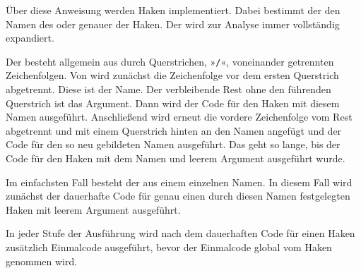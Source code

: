 \begin{Declaration}
\end{Declaration}
Über diese Anweisung werden Haken
implementiert. Dabei bestimmt der  den Namen des oder
genauer der Haken. Der  wird zur Analyse immer vollständig
expandiert.

Der  besteht allgemein aus durch Querstrichen,
»\texttt{/}«, voneinander getrennten Zeichenfolgen. Von 
wird zunächst die Zeichenfolge vor dem ersten Querstrich abgetrennt. Diese ist
der Name. Der verbleibende Rest ohne den führenden Querstrich ist das
Argument. Dann wird der Code für den Haken mit diesem Namen
ausgeführt. Anschließend wird erneut die vordere Zeichenfolge vom Rest
abgetrennt und mit einem Querstrich hinten an den Namen angefügt und der Code
für den so neu gebildeten Namen ausgeführt. Das geht so lange, bis der Code
für den Haken mit dem Namen  und leerem Argument
ausgeführt wurde.

Im einfachsten Fall besteht der  aus einem einzelnen
Namen. In diesem Fall wird zunächst der dauerhafte Code für genau einen durch
diesen Namen festgelegten Haken mit leerem Argument ausgeführt.

In jeder Stufe der Ausführung wird nach dem dauerhaften Code für einen Haken
zusätzlich Einmalcode ausgeführt, bevor der Einmalcode global vom Haken
genommen wird.

